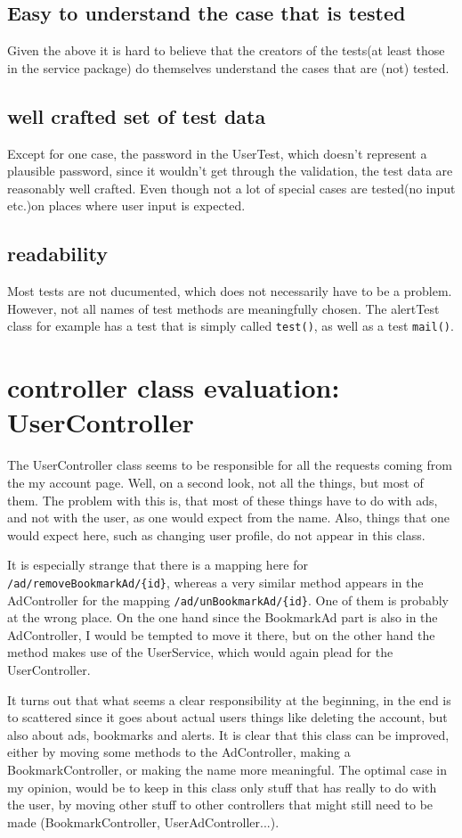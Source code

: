 \documentclass[a4wide]{article}
\begin{document}
\subsection{Easy to understand the case that is tested}
Given the above it is hard to believe that the creators of the tests(at least those in the service package) do themselves understand the cases that are (not) tested. 
\subsection{well crafted set of test data}
Except for one case, the password in the UserTest, which doesn't represent a plausible password, since it wouldn't get through the validation, the test data are reasonably well crafted. Even though not a lot of special cases are tested(no input etc.)on places where user input is expected. 
\subsection{readability}
Most tests are not ducumented, which does not necessarily have to be a problem. However, not all names of test methods are meaningfully chosen. The alertTest class for example has a test that is simply called \texttt{test()}, as well as a test \texttt{mail()}. 
\section{controller class evaluation: UserController}
The UserController class seems to be responsible for all the requests coming from the my account page. 
Well, on a second look, not all the things, but most of them. The problem with this is, that most of these things have to do with ads, and not with the user, as one would expect from the name. Also, things that one would expect here, such as changing user profile, do not appear in this class. 

It is especially strange that there is a mapping here for \texttt{/ad/removeBookmarkAd/\{id\}}, whereas a very similar method appears in the AdController for the mapping \texttt{/ad/unBookmarkAd/\{id\}}. One of them is probably at the wrong place. On the one hand since the BookmarkAd part is also in the AdController, I would be tempted to move it there, but on the other hand the method makes use of the UserService, which would again plead for the UserController. 

It turns out that what seems a clear responsibility at the beginning, in the end is to scattered since it goes about actual users things like deleting the account, but also about ads, bookmarks and alerts. It is clear that this class can be improved, either by moving some methods to the AdController, making a BookmarkController, or making the name more meaningful. The optimal case in my opinion, would be to keep in this class only stuff that has really to do with the user, by moving other stuff to other controllers that might still need to be made (BookmarkController, UserAdController...). 
\end{document}
